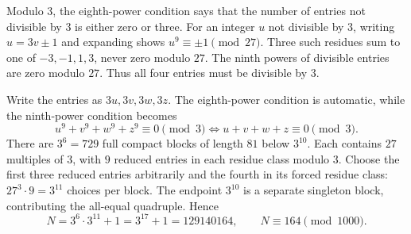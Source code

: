 Modulo $3$, the eighth-power condition says that the number of entries not divisible by $3$ is either zero or three. For an integer $u$ not divisible by $3$, writing $u=3v\pm1$ and expanding shows $u^9\equiv\pm1\pmod{27}$. Three such residues sum to one of $-3,-1,1,3$, never zero modulo $27$. The ninth powers of divisible entries are zero modulo $27$. Thus all four entries must be divisible by $3$.

Write the entries as $3u,3v,3w,3z$. The eighth-power condition is automatic, while the ninth-power condition becomes
\[
u^9+v^9+w^9+z^9\equiv0\pmod3
\iff u+v+w+z\equiv0\pmod3.
\]
There are $3^6=729$ full compact blocks of length $81$ below $3^{10}$. Each contains $27$ multiples of $3$, with $9$ reduced entries in each residue class modulo $3$. Choose the first three reduced entries arbitrarily and the fourth in its forced residue class: $27^3\cdot9=3^{11}$ choices per block.
The endpoint $3^{10}$ is a separate singleton block, contributing the all-equal quadruple. Hence
\[
N=3^6\cdot3^{11}+1=3^{17}+1=129140164,
\qquad\boxed{N\equiv164\pmod{1000}}.
\]
